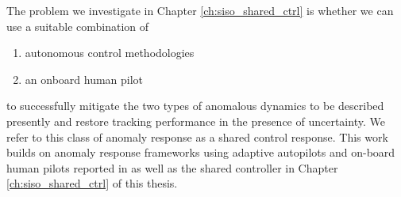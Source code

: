 The problem we investigate in Chapter \ref{ch:siso_shared_ctrl} is whether we can use a suitable combination of 
\begin{enumerate}[label=(\alph*)]
	\item autonomous control methodologies
	\item an onboard human pilot
\end{enumerate}
to successfully mitigate the two types of anomalous dynamics to be described presently and restore tracking performance in the presence of uncertainty. We refer to this class of anomaly response as a shared control response. This work builds on anomaly response frameworks using adaptive autopilots and on-board human pilots reported in \cite{farjadian2017bumpless} as well as the shared controller in Chapter \ref{ch:siso_shared_ctrl} of this thesis.


